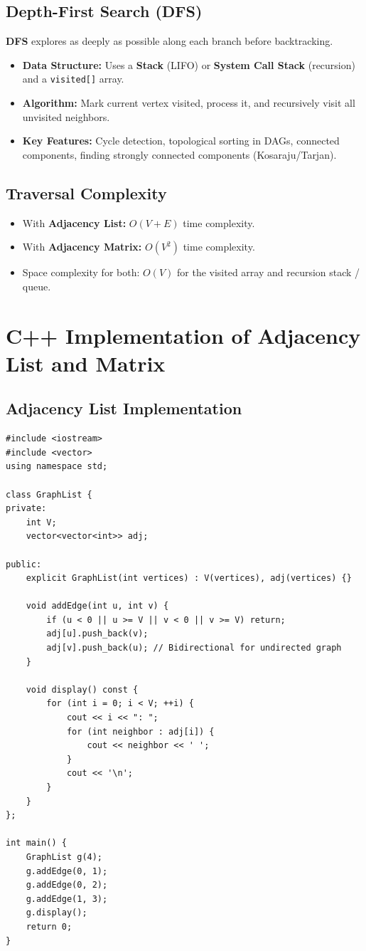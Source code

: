 \subsection{Depth-First Search (DFS)}
\textbf{DFS} explores as deeply as possible along each branch before backtracking.
\begin{itemize}
    \item \textbf{Data Structure:} Uses a \textbf{Stack} (LIFO) or \textbf{System Call Stack} (recursion) and a \texttt{visited[]} array.
    \item \textbf{Algorithm:} Mark current vertex visited, process it, and recursively visit all unvisited neighbors.
    \item \textbf{Key Features:} Cycle detection, topological sorting in DAGs, connected components, finding strongly connected components (Kosaraju/Tarjan).
\end{itemize}

\subsection{Traversal Complexity}
\begin{itemize}
    \item With \textbf{Adjacency List:} $\boxed{O(V + E)}$ time complexity.
    \item With \textbf{Adjacency Matrix:} $\boxed{O(V^2)}$ time complexity.
    \item Space complexity for both: $O(V)$ for the visited array and recursion stack / queue.
\end{itemize}

\section{C++ Implementation of Adjacency List and Matrix}

\subsection{Adjacency List Implementation}

\begin{lstlisting}[style=cppstyle, caption={C++ Graph implementation using Adjacency List.}]
#include <iostream>
#include <vector>
using namespace std;

class GraphList {
private:
    int V;
    vector<vector<int>> adj;

public:
    explicit GraphList(int vertices) : V(vertices), adj(vertices) {}

    void addEdge(int u, int v) {
        if (u < 0 || u >= V || v < 0 || v >= V) return;
        adj[u].push_back(v);
        adj[v].push_back(u); // Bidirectional for undirected graph
    }

    void display() const {
        for (int i = 0; i < V; ++i) {
            cout << i << ": ";
            for (int neighbor : adj[i]) {
                cout << neighbor << ' ';
            }
            cout << '\n';
        }
    }
};

int main() {
    GraphList g(4);
    g.addEdge(0, 1);
    g.addEdge(0, 2);
    g.addEdge(1, 3);
    g.display();
    return 0;
}
\end{lstlisting}

